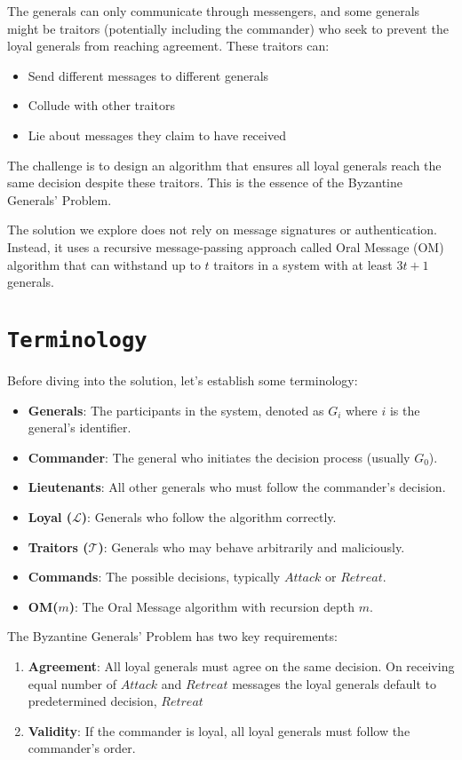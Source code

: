 \documentclass[11pt]{article}
\begin{document}
The generals can only communicate through messengers, and some generals might be traitors (potentially including the commander) who seek to prevent the loyal generals from reaching agreement. These traitors can:
\begin{itemize}
    \item Send different messages to different generals
    \item Collude with other traitors
    \item Lie about messages they claim to have received
\end{itemize}

The challenge is to design an algorithm that ensures all loyal generals reach the same decision despite these traitors. This is the essence of the Byzantine Generals' Problem.

The solution we explore does not rely on message signatures or authentication. Instead, it uses a recursive message-passing approach called Oral Message (OM) algorithm that can withstand up to $t$ traitors in a system with at least $3t+1$ generals.

\section*{\texttt{\Large Terminology}}
\justifying
Before diving into the solution, let's establish some terminology:

\begin{itemize}
    \item \textbf{Generals}: The participants in the system, denoted as $G_i$ where $i$ is the general's identifier.
    \item \textbf{Commander}: The general who initiates the decision process (usually $G_0$).
    \item \textbf{Lieutenants}: All other generals who must follow the commander's decision.
    \item \textbf{Loyal ($\mathcal{L}$)}: Generals who follow the algorithm correctly.
    \item \textbf{Traitors ($\mathcal{T}$)}: Generals who may behave arbitrarily and maliciously.
    \item \textbf{Commands}: The possible decisions, typically $Attack$ or $Retreat$.
    \item \textbf{OM($m$)}: The Oral Message algorithm with recursion depth $m$.
\end{itemize}

The Byzantine Generals' Problem has two key requirements:
\begin{enumerate}
    \item \textbf{Agreement}: All loyal generals must agree on the same decision. On receiving equal number of $Attack$ and $Retreat$ messages the loyal generals default to predetermined decision, $Retreat$
    \item \textbf{Validity}: If the commander is loyal, all loyal generals must follow the commander's order.
\end{enumerate}
\end{document}
